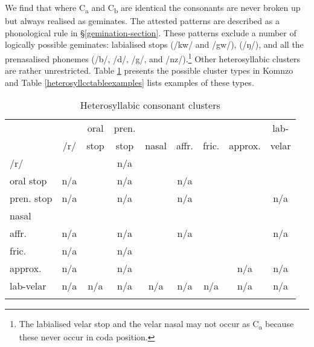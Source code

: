 We find that where C\textsubscript{a} and C\textsubscript{b} are identical the consonants are never broken up but always realised as geminates. The attested  patterns are described as a phonological rule in \S{}\ref{gemination-section}. These patterns exclude a number of logically possible geminates: labialised  stops (/kw/ and /gw/),   (/ŋ/), and all the prenasalised phonemes (/b/, /d/, /g/, and /nz/).\footnote{The labialised velar stop and the velar nasal may not occur as C\textsubscript{a} because these never occur in coda position.} Other heterosyllabic clusters are rather unrestricted. Table \ref{heterosyllcctable} presents the possible cluster types in Komnzo and Table \ref{heterosyllcctableexamples} lists examples of these types.

\begin{table}
\caption{Heterosyllabic consonant clusters}
\label{heterosyllcctable}
	\begin{tabularx}{\textwidth}{Xcccccccc}
		\lsptoprule
		&&{oral}&{pren.}&&&&&{lab-}\\
		& /r/ & {stop} & {stop}\footnotemark & {nasal} & {affr.} & {fric.} & {approx.} & {velar}\\ \midrule
		/r/ & \checkmark & \checkmark & n/a & \checkmark & \checkmark & \checkmark & \checkmark  & \checkmark\\%
		{oral stop} & n/a & \checkmark & n/a & \checkmark & n/a & \checkmark & \checkmark  & \checkmark\\%
		{pren. stop} & n/a & \checkmark & n/a & \checkmark & n/a & \checkmark & \checkmark  & n/a\\%
		{nasal} & \checkmark & \checkmark & \checkmark & \checkmark & \checkmark & \checkmark & \checkmark  & \checkmark\\%
		{affr.} & n/a & \checkmark & n/a & \checkmark & n/a & \checkmark & \checkmark & n/a\\%
		{fric.} &  n/a & \checkmark & n/a & \checkmark & \checkmark & \checkmark & \checkmark  & \checkmark\\%
		{approx.} &  n/a & \checkmark & n/a & \checkmark & \checkmark & \checkmark & n/a  & n/a\\%
		{lab-velar} & n/a & n/a& n/a& n/a& n/a& n/a& n/a& n/a\\%
		\lspbottomrule
	\end{tabularx}
\end{table}%

